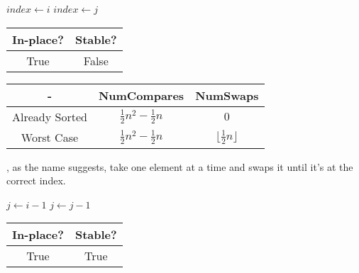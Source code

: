\documentclass{report}
\begin{document}
\noindent \hrulefill
\begin{algorithmic}[1]
   
    \State $index \gets i$
          \State $index \gets j$
        \EndIf
      \EndFor
        \State {} 
      \EndIf
    \EndFor
    \State {}
  \EndFunction
\end{algorithmic}
\noindent \hrulefill

\begin{center}
  \begin{tabular}{ | c | c | }
    \hline
    In-place? & Stable? \\
    \hline
    True & False \\
    \hline
  \end{tabular}
\end{center}

\begin{center}
  \begin{tabular}{ | c | c | c | }
    \hline
    - & NumCompares & NumSwaps \\
    \hline
    Already Sorted & $\frac{1}{2} n^2 - \frac{1}{2} n$ & $0$ \\
    \hline
    Worst Case &  $\frac{1}{2} n^2 - \frac{1}{2} n$ & $\lfloor \frac{1}{2} n \rfloor$ \\
    \hline
  \end{tabular}
\end{center}

, as the name suggests, take one element at a time and swaps it until it's at the correct index.

\noindent \hrulefill
\begin{algorithmic}[1]
   
      \State $j \gets i - 1$
      \State {} 
        \State $j \gets j - 1$
      \EndWhile
    \EndFor
    \State {}
  \EndFunction
\end{algorithmic}
\noindent \hrulefill

\begin{center}
  \begin{tabular}{ | c | c | }
    \hline
    In-place? & Stable? \\
    \hline
    True & True \\
    \hline
  \end{tabular}
\end{center}
\end{document}
